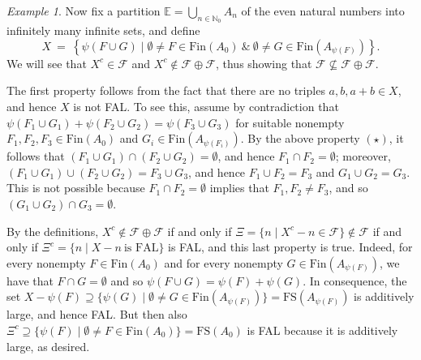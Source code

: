 \documentclass{amsart}
\theoremstyle{definition}
\theoremstyle{remark}
\newtheorem{example}[theorem]{Example}
\def\F{\mathscr{F}}
\def\E{\mathbb{E}}
\def\N{\mathbb{N}}
\def\Fin{\text{Fin}}
\begin{document}
\begin{example}
Now fix a partition $\E=\bigcup_{n\in\N_0}A_n$ of the
even natural numbers into infinitely many infinite sets, and define
$$X\ =\ \left\{\psi(F\cup G)\mid \emptyset\ne F\in\Fin(A_0)\ \&\
\emptyset\ne G\in\Fin(A_{\psi(F)})\right\}.$$
We will see that $X^c\in\F$ and $X^c\notin\F\oplus\F$,
thus showing that $\F\not\subseteq\F\oplus\F$.

The first property follows from the fact that there are no
triples $a,b,a+b\in X$, and hence $X$ is not FAL.
To see this, assume by contradiction that 
$\psi(F_1\cup G_1)+\psi(F_2\cup G_2)=\psi(F_3\cup G_3)$
for suitable nonempty  $F_1,F_2,F_3\in\Fin(A_0)$ and $G_i\in\Fin(A_{\psi(F_i)})$.
By the above property $(\star)$, it follows that
$(F_1\cup G_1)\cap(F_2\cup G_2)=\emptyset$, and hence
$F_1\cap F_2=\emptyset$; moreover,
$(F_1\cup G_1)\cup(F_2\cup G_2)=F_3\cup G_3$,
and hence $F_1\cup F_2=F_3$ and $G_1\cup G_2=G_3$.
This is not possible because $F_1\cap F_2=\emptyset$ implies that
$F_1,F_2\ne F_3$, and so 
$(G_1\cup G_2)\cap G_3=\emptyset$.

By the definitions, $X^c\not\in\F\oplus\F$ if and only if
$\Xi=\{n\mid X^c-n\in\F\}\not\in\F$ if and only if
$\Xi^c=\{n\mid X-n\ \text{is FAL}\}$ is FAL,
and this last property is true. Indeed, for every nonempty
$F\in\Fin(A_0)$ and for every nonempty $G\in\Fin(A_{\psi(F)})$,
we have that $F\cap G=\emptyset$ and so $\psi(F\cup G)=\psi(F)+\psi(G)$.
In consequence, the set 
$X-\psi(F)\supseteq\{\psi(G)\mid \emptyset\ne G\in\Fin(A_{\psi(F)})\}=
\text{FS}(A_{\psi(F)})$ is additively large, and hence FAL.
But then also $\Xi^c\supseteq\{\psi(F)\mid \emptyset\ne F\in\Fin(A_0)\}=
\text{FS}(A_0)$ is FAL because it is additively large, as desired.
\end{example}
\end{document}
